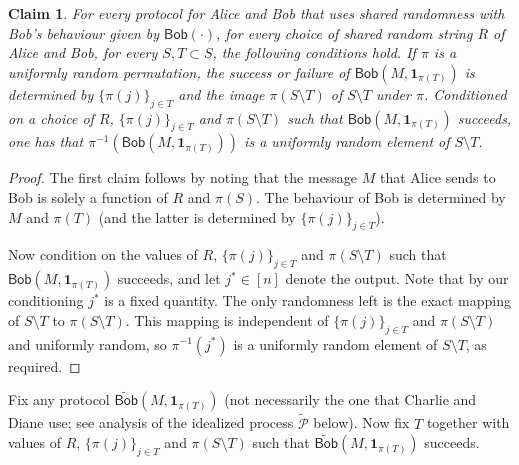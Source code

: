 \documentclass[11pt]{article}
\newtheorem{claim}{Claim}
\newcommand{\query}{\mathsf{Bob}}
\begin{document}
\begin{claim}\label{cl:uniform}
For every protocol for Alice and Bob that uses shared randomness with Bob's behaviour given by $\query(\cdot)$, for every choice of shared random string $R$ of Alice and Bob, for every $S, T\subset S$, the following conditions hold. If $\pi$ is a uniformly random permutation, the success or failure of $\query(M, \mathbf{1}_{\pi(T)})$ is determined by $\{\pi(j)\}_{j\in T}$ and the image $\pi(S\setminus T)$ of $S\setminus T$ under $\pi$. Conditioned on a choice of $R$, $\{\pi(j)\}_{j\in T}$ and $\pi(S\setminus T)$ such that $\query(M, \mathbf{1}_{\pi(T)})$ succeeds, one has that $\pi^{-1}(\query(M, \mathbf{1}_{\pi(T)}))$ is a uniformly random element of $S\setminus T$.
\end{claim}
\begin{proof}
The first claim follows by noting that the message $M$ that Alice sends to Bob is solely a function of $R$ and $\pi(S)$. The behaviour of Bob is determined by $M$ and $\pi(T)$ (and the latter is determined by $\{\pi(j)\}_{j\in T}$).

Now condition on the values of $R$, $\{\pi(j)\}_{j\in T}$ and $\pi(S\setminus T)$ such that  $\query(M, \mathbf{1}_{\pi(T)})$ succeeds, and let $j^*\in [n]$ denote the output. Note that by our conditioning $j^*$ is a fixed quantity. The only randomness left is the exact mapping of $S\setminus T$ to $\pi(S\setminus T)$. This mapping is independent of $\{\pi(j)\}_{j\in T}$ and $\pi(S\setminus T)$ and uniformly random, so $\pi^{-1}(j^*)$ is a uniformly random element of $S\setminus T$, as required.
\end{proof}

Fix any protocol $\widetilde{\query}(M, \mathbf{1}_{\pi(T)})$ (not necessarily the one that Charlie and Diane use; see analysis of the idealized process $\widetilde{\mathcal{P}}$ below). Now fix $T$ together with values of $R$, $\{\pi(j)\}_{j\in T}$ and $\pi(S\setminus T)$ such that  $\widetilde{\query}(M, \mathbf{1}_{\pi(T)})$ succeeds.  

\end{document}

